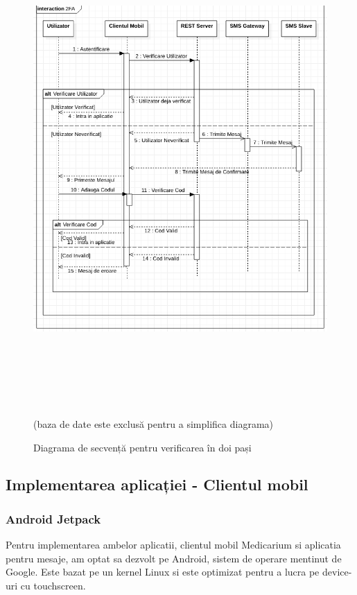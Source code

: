 \documentclass[12pt]{article}
\begin{document}
\begin{figure}[H]
\centering
\includegraphics[width=15cm, height=18cm]{2fa.png}
\caption{Diagrama de secvență pentru verificarea în doi pași} (baza de date este exclusă pentru a simplifica diagrama)
\end{figure}


\newpage
\subsection{Implementarea aplicației - Clientul mobil}
\subsubsection{Android Jetpack}

Pentru implementarea ambelor aplicatii, clientul mobil Medicarium si aplicatia pentru mesaje, am optat 
sa dezvolt pe Android, sistem de operare mentinut de Google. Este bazat pe un kernel Linux si este optimizat
pentru a lucra pe device-uri cu touchscreen. 
\end{document}
